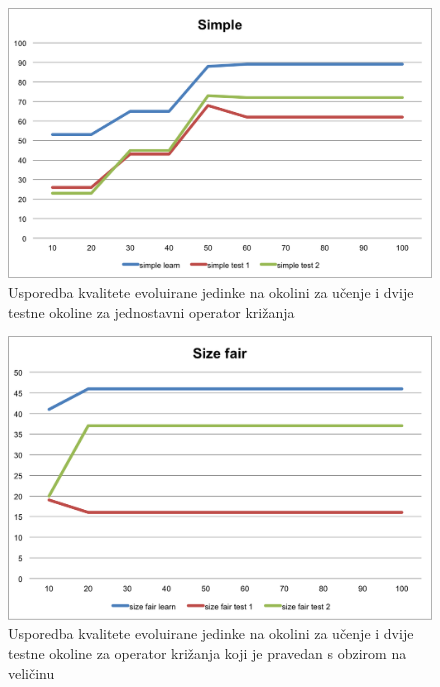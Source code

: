 \begin{figure}[H]
	\centering
	\includegraphics[scale=0.8]{./slike/cross-validation/simple.png}
	\caption{Usporedba kvalitete evoluirane jedinke na okolini za učenje i dvije testne okoline za jednostavni operator križanja}
	\label{simple}
\end{figure}

\begin{figure}[H]
	\centering
	\includegraphics[scale=0.8]{./slike/cross-validation/sizefair.png}
	\caption{Usporedba kvalitete evoluirane jedinke na okolini za učenje i dvije testne okoline za operator križanja koji je pravedan s obzirom na veličinu}
	\label{sizefair}
\end{figure}

